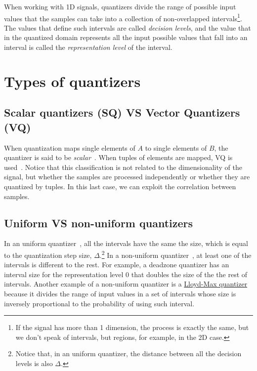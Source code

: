 When working with 1D signals, quantizers divide the range of possible
input values that the samples can take into a collection of
non-overlapped intervals\footnote{If the signal has more than 1
  dimension, the process is exactly the same, but we don't speak of
  intervals, but regions, for example, in the 2D case.}. The values
that define such intervals are called \emph{decision levels}, and the
value that in the quantized domain represents all the input possible
values that fall into an interval is called the \emph{representation
  level} of the interval.


\section{Types of quantizers}

\subsection{Scalar quantizers (SQ) VS Vector Quantizers (VQ)}

When quantization maps single elements of $A$ to single elements of
$B$, the quantizer is said to be
\emph{scalar}~\cite{vruiz__scalar_quantization}. When tuples of
elements are mapped, VQ is
used~\cite{vruiz__vector_quantization}. Notice that this
classification is not related to the dimensionality of the signal, but
whether the samples are processed independently or whether they are
quantized by tuples. In this last case, we can exploit the correlation
between samples.


\subsection{Uniform VS non-uniform quantizers}

In an uniform quantizer~\cite{vruiz__scalar_quantization}, all the
intervals have the same the size, which is equal to the quantization
step size, $\Delta$.\footnote{Notice that, in an uniform quantizer,
  the distance between all the decision levels is also $\Delta$.} In a
non-uniform quantizer~\cite{vruiz__scalar_quantization}, at least one
of the intervals is different to the rest. For example, a deadzone
quantizer \cite{vruiz__scalar_quantization} has an interval size for
the representation level 0 that doubles the size of the the rest of
intervals. Another example of a non-uniform quantizer is a
\href{https://en.wikipedia.org/wiki/Lloyd%27s_algorithm}{Lloyd-Max
  quantizer} \cite{vruiz__scalar_quantization} because it divides the
range of input values in a set of intervals whose size is inversely
proportional to the probability of using such interval.

